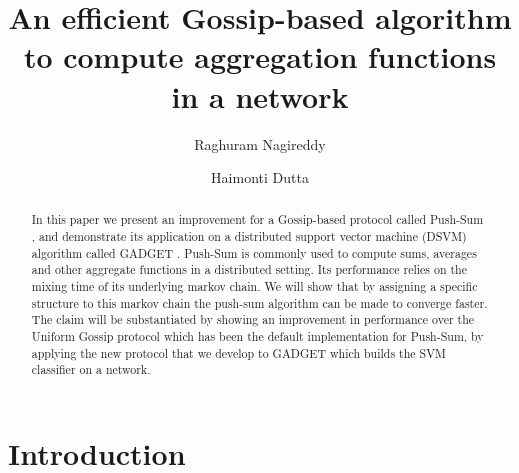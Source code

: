 \documentclass[runningheads,a4paper]{llncs}
\begin{document}
 

\mainmatter  %

\title{An efficient Gossip-based algorithm to compute aggregation functions in a network}


\author{Raghuram Nagireddy%
\and Haimonti Dutta}
%


\maketitle


\begin{abstract} 
In this paper we present an improvement for a Gossip-based protocol called Push-Sum \cite{Kempe03gossip-basedcomputation}, and demonstrate its application on a distributed support vector machine (DSVM) algorithm called GADGET \cite{Hensel_gadgetsvm}. Push-Sum is commonly used to compute sums, averages and other aggregate functions in a distributed setting. Its performance relies on the mixing time of its underlying markov chain. We will show that by assigning a specific structure to this markov chain the push-sum algorithm can be made to converge faster. The claim will be substantiated by showing an improvement in performance over the Uniform Gossip protocol which has been the default implementation for Push-Sum, by applying the new protocol that we develop to GADGET which builds the SVM classifier on a network.

\end{abstract} 

\section{Introduction}
\label{intro}
\end{document}
